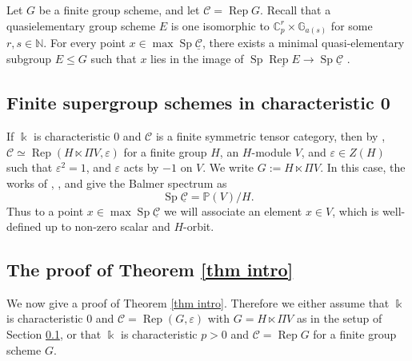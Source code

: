 \documentclass[11pt]{amsart}
\def\C{\mathbb{C}}
\def\N{\mathbb{N}}
\def\G{\mathbb{G}}
\def\Cs{\mathcal{C}}
\def\Cs{\mathscr{C}}
\def\Rep{\operatorname{Rep}}
\def\ul{\underline}
\def\Sp{\operatorname{Sp}}
\theoremstyle{definition}
\theoremstyle{remark}
\numberwithin{equation}{section}
\begin{document}
Let $G$ be a finite group scheme, and let $\Cs=\Rep G$.  Recall that a quasielementary group scheme $E$ is one isomorphic to $\C_p^r\times\G_{a(s)}$ for some $r,s\in\N$. For every point $x\in\max\Sp\ul{\Cs}$, there exists a minimal quasi-elementary subgroup $E\leq G$ such that $x$ lies in the image of $\Sp\ul{\Rep E}\to\Sp\ul{\Cs}$ \cite{FP}.



\subsection{Finite supergroup schemes in characteristic 0}\label{section super}

If $\Bbbk$ is characteristic 0 and $\Cs$ is a finite symmetric tensor category, then by \cite{Del}, $\Cs\simeq\Rep(H\ltimes\Pi V,\varepsilon)$ for a finite group $H$, an $H$-module $V$, and $\varepsilon\in Z(H)$ such that $\varepsilon^2=1$, and $\varepsilon$ acts by $-1$ on $V$.  We write $G:=H\ltimes\Pi V$.  In this case, the works of \cite{BKN}, \cite{HV}, and \cite{DK} give the Balmer spectrum as
\[
\Sp\ul{\Cs}=\mathbb{P}(V)/H.
\]
Thus to a point $x\in\max\Sp\ul{\Cs}$ we will associate an element $x\in V$, which is well-defined up to non-zero scalar and $H$-orbit.


\subsection{The proof of Theorem \ref{thm intro}}

We now give a proof of Theorem \ref{thm intro}.  Therefore we either assume that $\Bbbk$ is characteristic 0 and $\Cs=\Rep(G,\varepsilon)$ with $G=H\ltimes\Pi V$ as in the setup of Section \ref{section super}, or that $\Bbbk$ is characteristic $p>0$ and $\Cs=\Rep G$ for a finite group scheme $G$.
\end{document}
